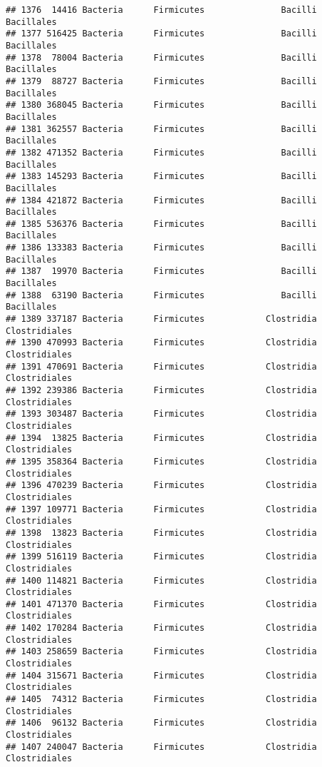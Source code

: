 \documentclass[
]{article}
\begin{document}
\begin{verbatim}
## 1376  14416 Bacteria      Firmicutes               Bacilli          Bacillales
## 1377 516425 Bacteria      Firmicutes               Bacilli          Bacillales
## 1378  78004 Bacteria      Firmicutes               Bacilli          Bacillales
## 1379  88727 Bacteria      Firmicutes               Bacilli          Bacillales
## 1380 368045 Bacteria      Firmicutes               Bacilli          Bacillales
## 1381 362557 Bacteria      Firmicutes               Bacilli          Bacillales
## 1382 471352 Bacteria      Firmicutes               Bacilli          Bacillales
## 1383 145293 Bacteria      Firmicutes               Bacilli          Bacillales
## 1384 421872 Bacteria      Firmicutes               Bacilli          Bacillales
## 1385 536376 Bacteria      Firmicutes               Bacilli          Bacillales
## 1386 133383 Bacteria      Firmicutes               Bacilli          Bacillales
## 1387  19970 Bacteria      Firmicutes               Bacilli          Bacillales
## 1388  63190 Bacteria      Firmicutes               Bacilli          Bacillales
## 1389 337187 Bacteria      Firmicutes            Clostridia       Clostridiales
## 1390 470993 Bacteria      Firmicutes            Clostridia       Clostridiales
## 1391 470691 Bacteria      Firmicutes            Clostridia       Clostridiales
## 1392 239386 Bacteria      Firmicutes            Clostridia       Clostridiales
## 1393 303487 Bacteria      Firmicutes            Clostridia       Clostridiales
## 1394  13825 Bacteria      Firmicutes            Clostridia       Clostridiales
## 1395 358364 Bacteria      Firmicutes            Clostridia       Clostridiales
## 1396 470239 Bacteria      Firmicutes            Clostridia       Clostridiales
## 1397 109771 Bacteria      Firmicutes            Clostridia       Clostridiales
## 1398  13823 Bacteria      Firmicutes            Clostridia       Clostridiales
## 1399 516119 Bacteria      Firmicutes            Clostridia       Clostridiales
## 1400 114821 Bacteria      Firmicutes            Clostridia       Clostridiales
## 1401 471370 Bacteria      Firmicutes            Clostridia       Clostridiales
## 1402 170284 Bacteria      Firmicutes            Clostridia       Clostridiales
## 1403 258659 Bacteria      Firmicutes            Clostridia       Clostridiales
## 1404 315671 Bacteria      Firmicutes            Clostridia       Clostridiales
## 1405  74312 Bacteria      Firmicutes            Clostridia       Clostridiales
## 1406  96132 Bacteria      Firmicutes            Clostridia       Clostridiales
## 1407 240047 Bacteria      Firmicutes            Clostridia       Clostridiales

\end{verbatim}
\end{document}
